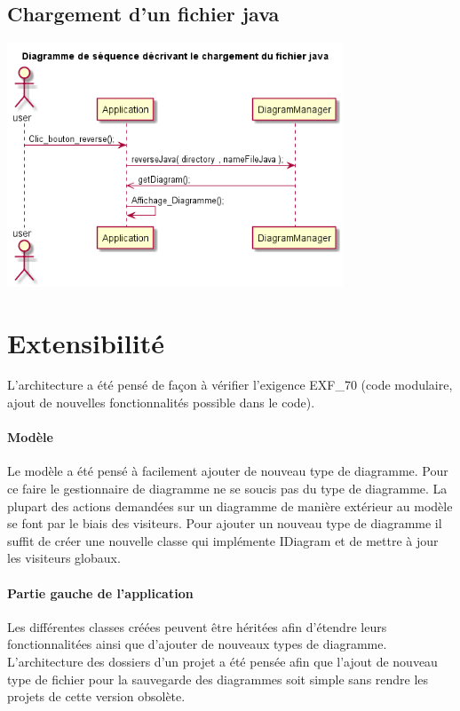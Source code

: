 \documentclass[a4paper,10pt]{article}
\begin{document}
   \subsection{Chargement d'un fichier java}
    \begin{center}
	     \includegraphics[width=10cm]{Image/Charge_File_Java.png}
    \end{center}
  
\section{Extensibilité}
  L'architecture a été pensé de façon à vérifier l'exigence EXF\_70 (code modulaire, ajout de nouvelles fonctionnalités possible dans le code).
  \paragraph{Modèle}
    Le modèle a été pensé à facilement ajouter de nouveau type de diagramme. Pour ce faire le gestionnaire de diagramme ne se soucis pas du type de diagramme.
    La plupart des actions demandées sur un diagramme de manière extérieur au modèle se font par le biais des visiteurs. Pour ajouter un nouveau
    type de diagramme il suffit de créer une nouvelle classe qui implémente IDiagram et de mettre à jour les visiteurs globaux.
  \paragraph{Partie gauche de l'application}
    Les différentes classes créées peuvent être héritées afin d'étendre leurs fonctionnalitées ainsi que d'ajouter de nouveaux types de diagramme. 
    L'architecture des dossiers d'un projet a été pensée afin que l'ajout de nouveau type de fichier pour la sauvegarde des diagrammes
    soit simple sans rendre les projets de cette version obsolète.
\end{document}
